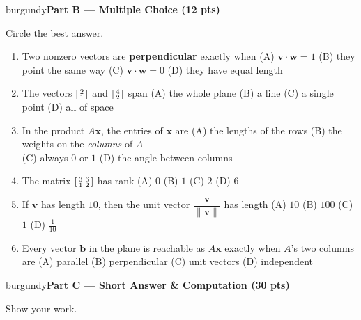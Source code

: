 \documentclass[10pt]{article}
\newcommand{\vv}{\mathbf{v}}
\newcommand{\ww}{\mathbf{w}}
\newcommand{\bb}{\mathbf{b}}
\newcommand{\xx}{\mathbf{x}}
\newcommand{\parthead}[1]{%
  \vspace{6pt}\noindent
  \begin{headlinebox}{burgundy}{\color{white}\bfseries #1}\end{headlinebox}%
  \vspace{4pt}}
\begin{document}
\parthead{Part B --- Multiple Choice (12 pts)}
Circle the best answer.

\begin{enumerate}[leftmargin=1.9em, itemsep=9pt]
  \item Two nonzero vectors are \textbf{perpendicular} exactly when
    \hfill (A) $\vv\cdot\ww=1$ \quad (B) they point the same way \quad
    (C) $\vv\cdot\ww=0$ \quad (D) they have equal length
  \item The vectors $\begin{bsmallmatrix}2\\1\end{bsmallmatrix}$ and
    $\begin{bsmallmatrix}4\\2\end{bsmallmatrix}$ span
    \hfill (A) the whole plane \quad (B) a line \quad (C) a single point \quad (D) all of space
  \item In the product $A\xx$, the entries of $\xx$ are
    \hfill (A) the lengths of the rows \quad (B) the weights on the \emph{columns} of $A$ \\
    \phantom{x}\hfill (C) always $0$ or $1$ \quad (D) the angle between columns
  \item The matrix $\begin{bsmallmatrix}3&6\\1&2\end{bsmallmatrix}$ has rank
    \hfill (A) $0$ \quad (B) $1$ \quad (C) $2$ \quad (D) $6$
  \item If $\vv$ has length $10$, then the unit vector $\dfrac{\vv}{\|\vv\|}$ has length
    \hfill (A) $10$ \quad (B) $100$ \quad (C) $1$ \quad (D) $\tfrac{1}{10}$
  \item Every vector $\bb$ in the plane is reachable as $A\xx$ exactly when $A$'s two columns are
    \hfill (A) parallel \quad (B) perpendicular \quad (C) unit vectors \quad (D) independent
\end{enumerate}

\boxguard[12]
\parthead{Part C --- Short Answer \& Computation (30 pts)}
Show your work.
\end{document}
